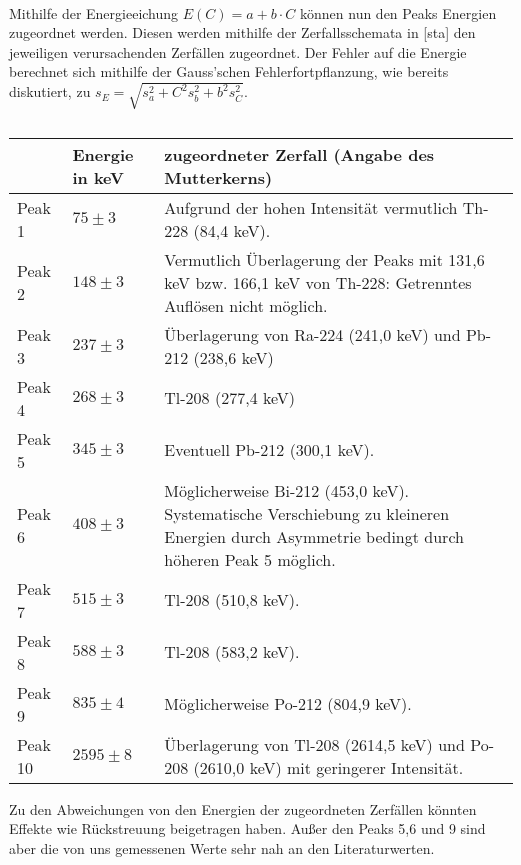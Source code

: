 ~\\
Mithilfe der Energieeichung $E(C)=a+b\cdot C$ können nun den Peaks Energien zugeordnet werden. Diesen werden mithilfe der Zerfallsschemata in [sta] den jeweiligen verursachenden Zerfällen zugeordnet. Der Fehler auf die Energie berechnet sich mithilfe der Gauss'schen Fehlerfortpflanzung, wie bereits diskutiert, zu $s_{E}=\sqrt{s_{a}^{2}+C^{2}s_{b}^{2}+b^{2}s_{C}^{2}}$.
\clearpage
\begin{table}[h]
\begin{center}
\caption{}
\begin{tabular}{|l|l|p{10 cm}|}
\hline
 & Energie in keV & zugeordneter Zerfall (Angabe des Mutterkerns) \\ \hline
Peak 1 & $75\pm3$ & Aufgrund der hohen Intensität vermutlich Th-228 (84,4 keV). \\ \hline
Peak 2 & $148\pm3$ & Vermutlich Überlagerung der Peaks mit 131,6 keV bzw. 166,1 keV von Th-228: Getrenntes Auflösen nicht möglich. \\ \hline
Peak 3 & $237\pm3$ &  Überlagerung von Ra-224 (241,0 keV) und Pb-212 (238,6 keV) \\ \hline
Peak 4 & $268\pm3$ & Tl-208 (277,4 keV)\\ \hline
Peak 5 & $345\pm3$ & Eventuell Pb-212 (300,1 keV).  \\ \hline
Peak 6 & $408\pm3$ & Möglicherweise Bi-212 (453,0 keV). Systematische Verschiebung zu kleineren Energien durch Asymmetrie bedingt durch höheren Peak 5 möglich. \\ \hline
Peak 7 & $515\pm3$ & Tl-208 (510,8 keV). \\ \hline
Peak 8 & $588\pm3$ & Tl-208 (583,2 keV). \\ \hline
Peak 9 & $835\pm4$ & Möglicherweise Po-212 (804,9  keV). \\ \hline
Peak 10 & $2595\pm8$ & Überlagerung von Tl-208 (2614,5 keV) und Po-208 (2610,0 keV) mit geringerer Intensität. \\ \hline
\end{tabular}
\end{center}
\label{}
\end{table}
Zu den Abweichungen von den Energien der zugeordneten Zerfällen könnten Effekte wie Rückstreuung beigetragen haben. Außer den Peaks 5,6 und 9 sind aber die von uns gemessenen Werte sehr nah an den Literaturwerten. 
